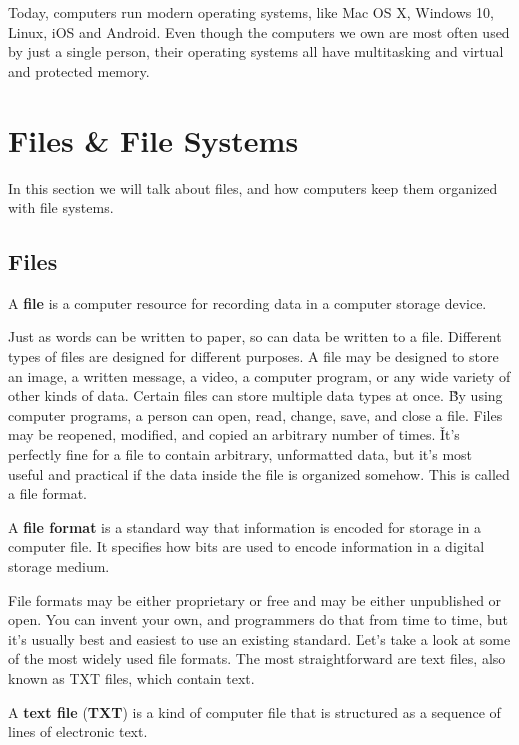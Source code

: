 Today, computers run modern operating systems, like Mac OS X, Windows 10, Linux, iOS and Android. Even though the
computers we own are most often used by just a single person, their operating systems all have multitasking and virtual
and protected memory.

\section{Files \& File Systems}

In this section we will talk about files, and how computers keep them organized with file systems.

\subsection{Files}

\bd[File]
A \textbf{file} is a computer resource for recording data in a computer storage device.
\ed

Just as words can be written to paper, so can data be written to a file. Different types of files are designed for
different purposes. A file may be designed to store an image, a written message, a video, a computer program, or any
wide variety of other kinds of data. Certain files can store multiple data types at once. \v

By using computer programs, a person can open, read, change, save, and close a file. Files may be reopened, modified,
and copied an arbitrary number of times. \v

It's perfectly fine for a file to contain arbitrary, unformatted data, but it's most useful and practical if the data
inside the file is organized somehow. This is called a file format.

A \textbf{file format} is a standard way that information is encoded for storage in a computer file. It specifies how
bits are used to encode information in a digital storage medium.
\ed

File formats may be either proprietary or free and may be either unpublished or open. You can invent your own, and
programmers do that from time to time, but it's usually best and easiest to use an existing standard. \v

Let's take a look at some of the most widely used file formats. The most straightforward are text files, also known as
TXT files, which contain text.

A \textbf{text file} (\textbf{TXT}) is a kind of computer file that is structured as a sequence of lines of
electronic text.
\ed

